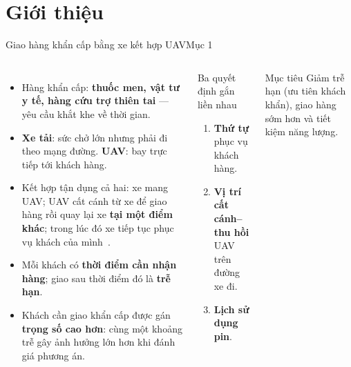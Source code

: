 \documentclass[aspectratio=169,10pt,t,xcolor={table}]{beamer}
\newcommand{\src}[1]{\hfill{\normalfont\footnotesize\color{white!62!navy}#1}}  %
\begin{document}
\section{Giới thiệu}

\begin{frame}{Giao hàng khẩn cấp bằng xe kết hợp UAV\src{Mục 1}}
\begin{columns}[T,onlytextwidth]
\begin{itemize}\small
\item Hàng khẩn cấp: \textbf{thuốc men, vật tư y tế, hàng cứu trợ thiên tai} --- yêu cầu khắt khe về thời gian.
\item \textbf{Xe tải}: sức chở lớn nhưng phải đi theo mạng đường. \textbf{UAV}: bay trực tiếp tới khách hàng.
\item Kết hợp tận dụng cả hai: xe mang UAV; UAV cất cánh từ xe để giao hàng rồi quay lại xe \textbf{tại một điểm khác};
      trong lúc đó xe tiếp tục phục vụ khách của mình~\cite{murray2015,agatz2018}.
\item Mỗi khách có \textbf{thời điểm cần nhận hàng}; giao sau thời điểm đó là \textbf{trễ hạn}.
\item Khách cần giao khẩn cấp được gán \textbf{trọng số cao hơn}: cùng một khoảng trễ gây ảnh hưởng lớn hơn khi đánh giá phương án.
\end{itemize}
\begin{block}{Ba quyết định gắn liền nhau}
\begin{enumerate}\small
\item \textbf{Thứ tự} phục vụ khách hàng.
\item \textbf{Vị trí cất cánh--thu hồi} UAV trên đường xe đi.
\item \textbf{Lịch sử dụng pin}.
\end{enumerate}
\end{block}
\vspace{4pt}
\begin{exampleblock}{Mục tiêu}
\small Giảm trễ hạn (ưu tiên khách khẩn), giao hàng sớm hơn và tiết kiệm năng lượng.
\end{exampleblock}
\end{columns}
\end{frame}
\end{document}
